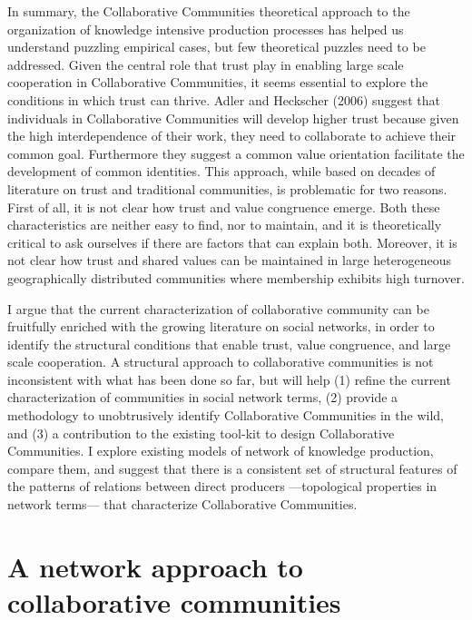 In summary, the Collaborative Communities theoretical approach to the organization of knowledge intensive production processes has helped us understand puzzling empirical cases, but few theoretical puzzles need to be addressed. Given the central role that trust play in enabling large scale cooperation in Collaborative Communities, it seems essential to explore the conditions in which trust can thrive. Adler and Heckscher (2006) suggest that individuals in Collaborative Communities will develop higher trust because given the high interdependence of their work, they need to collaborate to achieve their common goal.  Furthermore they suggest a common value orientation facilitate the development of common identities. This approach, while based on decades of literature on trust and traditional communities, is problematic for two reasons. First of all, it is not clear how trust and value congruence emerge. Both these characteristics are neither easy to find, nor to maintain, and it is theoretically critical to ask ourselves if there are factors that can explain both. Moreover, it is not clear how trust and shared values can be maintained in large heterogeneous geographically distributed communities where membership exhibits high turnover.

I argue that the current characterization of collaborative community can be fruitfully enriched with the growing literature on social networks, in order to identify the structural conditions that enable trust, value congruence, and large scale cooperation. A structural approach to collaborative communities is not inconsistent with what has been done so far, but will help (1) refine the current characterization of communities in social network terms, (2) provide a methodology to unobtrusively identify Collaborative Communities in the wild, and (3) a contribution to the existing tool-kit to design Collaborative Communities. I explore existing models of network of knowledge production, compare them, and suggest that there is a consistent set of structural features of the patterns of relations between direct producers ---topological properties in network terms--- that characterize Collaborative Communities.

\section{A network approach to collaborative communities}

